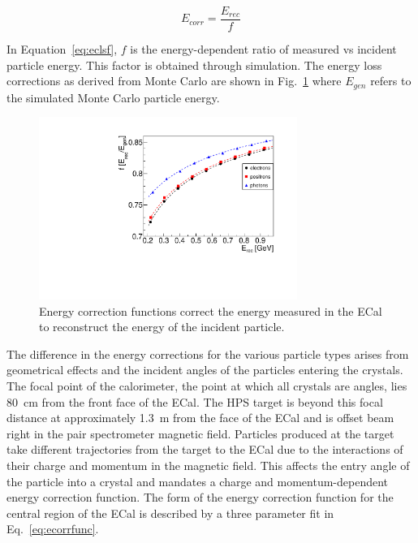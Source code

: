 \begin{equation}
\label{eq:eclsf}
E_{corr} = \dfrac{E_{rec}}{f}   
\end{equation}

In Equation~\eqref{eq:eclsf}, $f$ is the energy-dependent ratio of measured vs incident particle energy. This factor is obtained through simulation. The energy loss corrections as derived from Monte Carlo are shown in Fig.~\ref{Figure:ecorr} where $E_{gen}$ refers to the simulated Monte Carlo particle energy.

\begin{figure}[thb]
  \centering
      \includegraphics[width=0.75\textwidth]{pics/performance/energycorrection.pdf}
  \caption[ECal energy shower correction functions from simulation]{Energy correction functions correct the energy measured in the ECal to reconstruct the energy of the incident particle.}
  \label{Figure:ecorr}
\end{figure}

The difference in the energy corrections for the various particle types arises from geometrical effects and the incident angles of the particles entering the crystals.~\cite{szumila-vance_hps_ecal_2014} The focal point of the calorimeter, the point at which all crystals are angles, lies 80~cm from the front face of the ECal. The HPS target is beyond this focal distance at approximately 1.3~m from the face of the ECal and is offset beam right in the pair spectrometer magnetic field. Particles produced at the target take different trajectories from the target to the ECal due to the interactions of their charge and momentum in the magnetic field. This affects the entry angle of the particle into a crystal and mandates a charge and momentum-dependent energy correction function. The form of the energy correction function for the central region of the ECal is described by a three parameter fit in Eq.~\eqref{eq:ecorrfunc}.

